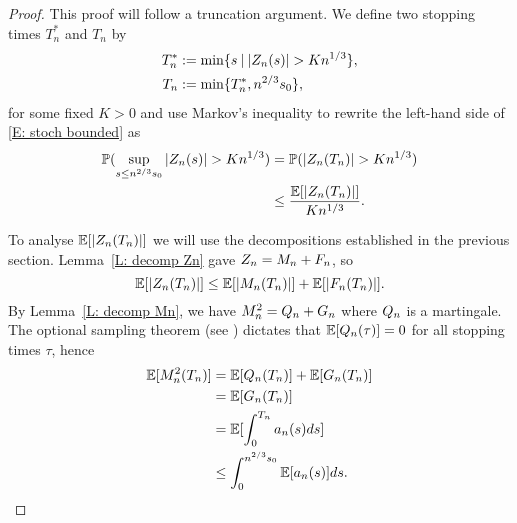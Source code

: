 \begin{proof}
	This proof will follow a truncation argument.
	We define two stopping times $T^*_n$ and $T_n$ by
	\begin{align} 
	T^*_n &:= \min \lbrace s \: | \: |Z_n(s)| > K n^{1 / 3} \rbrace, \label{E: def T*n} \\
	T_n &:= \min \lbrace T^*_n, n^{2 / 3}s_0 \rbrace ,  \label{E: def Tn}
	\end{align}
	for some fixed $K>0$ and use Markov's inequality to rewrite the left-hand side of \eqref{E: stoch bounded} as
	\begin{equation} \label{E: stoch bounded 2}
	\begin{aligned}
	\mathbb{P}( \sup_{s\leq n^{2/3} s_0} |Z_n(s)| > K n^{1 / 3} ) &= \mathbb{P}( |Z_n(T_n)| > Kn^{1 / 3} ) \\
	&\leq \frac{\mathbb{E}[|Z_n(T_n)|]}{Kn^{1 / 3}}.
	\end{aligned} 
	\end{equation}
	
	To analyse $\mathbb{E}[|Z_n(T_n)|]$ we will use the decompositions established in the previous section. 
	Lemma~\ref{L: decomp Zn} gave $Z_n = M_n + F_n$,
	so \begin{equation} \label{E: Exp(|Zn|)}
	\mathbb{E}[|Z_n(T_n)|] \leq \mathbb{E}[|M_n(T_n)|] + \mathbb{E}[|F_n(T_n)|].
	\end{equation}
	By Lemma~\ref{L: decomp Mn}, we have $M^2_n = Q_n + G_n$ where $Q_n$ is a martingale. 
	The optional sampling theorem (see \cite[Theorem 10.11, p.203]{Klenke.2006}) dictates that 
	$\mathbb{E}[Q_n(\tau)] = 0$ 
	for all stopping times $\tau$, hence 
	\begin{align*}
	\mathbb{E}[M^2_n(T_n)] 
	&= \mathbb{E}[Q_n(T_n)] + \mathbb{E}[G_n(T_n)] \\
	&= \mathbb{E}[G_n(T_n)] \\
	&= \mathbb{E}[ \int_{0}^{T_n} a_n(s)ds ] \\
	&\leq \int_{0}^{n^{2 / 3}s_0} \mathbb{E}[a_n(s)] ds.
	\end{align*}
	

\end{proof}
